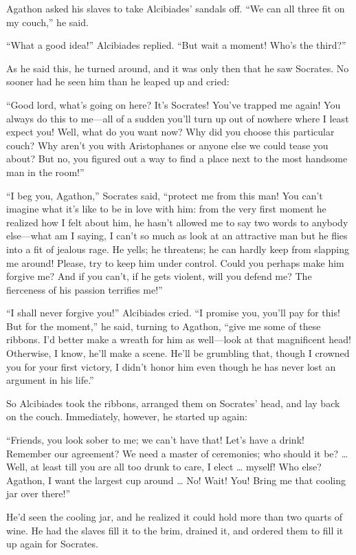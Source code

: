 Agathon asked his slaves to take Alcibiades' sandals off. “We can all
three fit on my couch,” he said.

“What a good idea!” Alcibiades replied. “But wait a moment! Who's the
third?”

As he said this, he turned around, and it was only then that he saw
Socrates. No sooner had he seen him than he leaped up and cried:

“Good lord, what's going on here? It's Socrates! You've trapped me
 again! You always do this to me---all of a sudden you'll turn up
out of nowhere where I least expect you! Well, what do you want now? Why
did you choose this particular couch? Why aren't you with Aristophanes
or anyone else we could tease you about? But no, you figured out a way
to find a place next to the most handsome man in the room!”

“I beg you, Agathon,” Socrates said, “protect me from this man! You
 can't imagine what it's like to be in love with him: from the
very first moment he realized how I felt about him, he hasn't allowed me
to say two words to anybody else---what am I saying, I can't so much as
look at an attractive man but he flies into a fit of jealous rage. He
yells; he threatens; he can hardly keep from slapping me around! Please,
try to keep him under control. Could you perhaps make him forgive me?
And if you can't, if he gets violent, will you defend me? The fierceness
of his passion terrifies me!”

“I shall never forgive you!” Alcibiades cried. “I promise you, you'll
pay  for this! But for the moment,” he said, turning to Agathon,
“give me some of these ribbons. I'd better make a wreath for him as
well---look at that magnificent head! Otherwise, I know, he'll make a
scene. He'll be grumbling that, though I crowned you for your first
victory, I didn't honor him even though he has never lost an argument in
his life.”

So Alcibiades took the ribbons, arranged them on Socrates' head, and lay
back on the couch. Immediately, however, he started up again:

“Friends, you look sober to me; we can't have that! Let's have a drink!
Remember our agreement? We need a master of ceremonies; who should it
be? \ldots{} Well, at least till you are all too drunk to care, I elect
\ldots{} myself! Who else? Agathon, I want the largest cup around
\ldots{} No! Wait! You!  Bring me that cooling jar over
there!”

He'd seen the cooling jar, and he realized it could hold more than two
quarts of wine. He had the slaves fill it to the brim, drained it, and
ordered them to fill it up again for Socrates.

